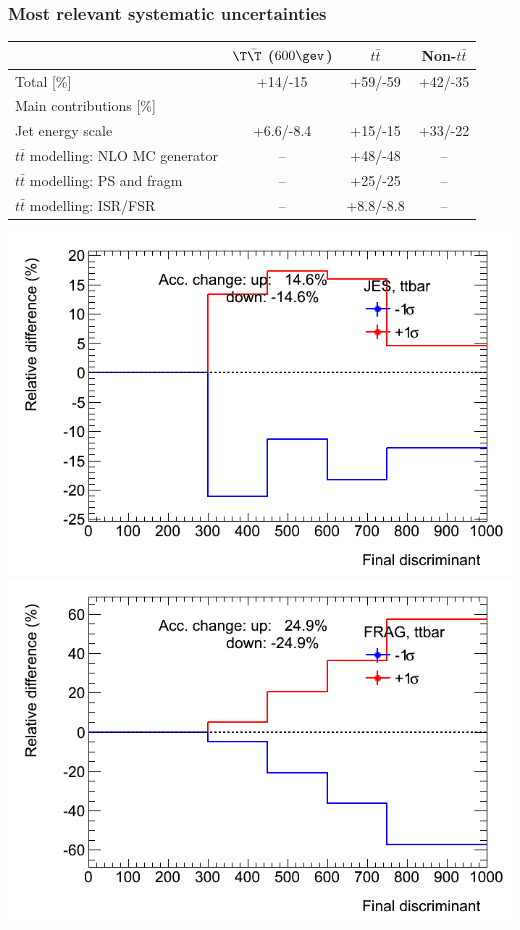 \begin{frame}\frametitle{Most relevant systematic uncertainties}
\centering\footnotesize

\begin{tabular}{l*{3}{c}}
\toprule
 & $\T\bar{\T}$ ($600\gev$) & $t\bar{t}$ & Non-$t\bar{t}$\\
\midrule
Total [\%] & +14/-15 & +59/-59 & +42/-35\\
\midrule
Main contributions [\%] &&&\\
Jet energy scale & +6.6/-8.4 & +15/-15 & +33/-22\\  
$t\bar{t}$ modelling: NLO MC generator & -- & +48/-48 & --\\  
$t\bar{t}$ modelling: PS and fragm & -- & +25/-25 & --\\  
$t\bar{t}$ modelling: ISR/FSR & -- & +8.8/-8.8 & --\\   
\bottomrule
\end{tabular}

\includegraphics[width=.4\textwidth]{pics/ELEMUON_tight_Bin1_ttbar_JES.png}
\includegraphics[width=.4\textwidth]{pics/ELEMUON_tight_Bin1_ttbar_FRAG.png}


\end{frame}
